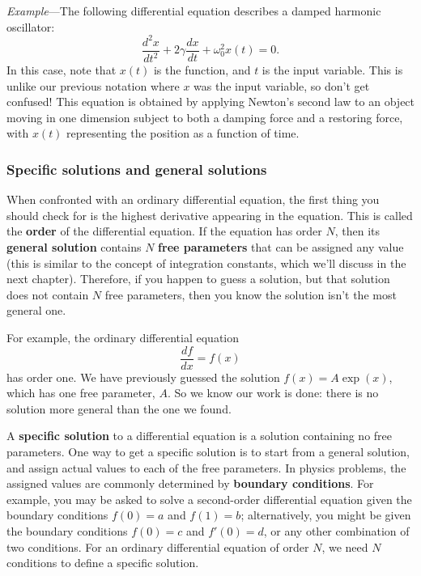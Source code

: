 \documentclass[10pt,a4paper]{article}
\begin{document}
\begin{framed}\noindent
  \textit{Example}---The following differential equation describes a
  damped harmonic oscillator:
  \begin{equation}
    \frac{d^2 x}{dt^2} + 2\gamma\frac{dx}{dt} + \omega_0^2 x(t) = 0.
  \end{equation}
  In this case, note that $x(t)$ is the function, and $t$ is the input
  variable. This is unlike our previous notation where $x$ was the
  input variable, so don't get confused! This equation is obtained by
  applying Newton's second law to an object moving in one dimension
  subject to both a damping force and a restoring force, with $x(t)$
  representing the position as a function of time.
\end{framed}

\subsubsection{Specific solutions and general solutions}
\label{specific-solutions-and-general-solutions}

When confronted with an ordinary differential equation, the first
thing you should check for is the highest derivative appearing in the
equation. This is called the \textbf{order} of the differential
equation. If the equation has order $N$, then its \textbf{general
  solution} contains $N$ \textbf{free parameters} that can be assigned
any value (this is similar to the concept of integration constants,
which we'll discuss in the next chapter). Therefore, if you happen to
guess a solution, but that solution does not contain $N$ free
parameters, then you know the solution isn't the most general one.

For example, the ordinary differential equation
\begin{equation}
\frac{df}{dx} = f(x)
\end{equation}
has order one. We have previously guessed the solution $f(x) = A
\exp(x)$, which has one free parameter, $A$. So we know our work is
done: there is no solution more general than the one we found.

A \textbf{specific solution} to a differential equation is a solution
containing no free parameters. One way to get a specific solution is
to start from a general solution, and assign actual values to each of
the free parameters. In physics problems, the assigned values are
commonly determined by \textbf{boundary conditions}. For example, you
may be asked to solve a second-order differential equation given the
boundary conditions $f(0) = a$ and $f(1) = b$; alternatively, you
might be given the boundary conditions $f(0) = c$ and $f'(0) = d$, or
any other combination of two conditions. For an ordinary differential
equation of order $N$, we need $N$ conditions to define a specific
solution.
\end{document}
